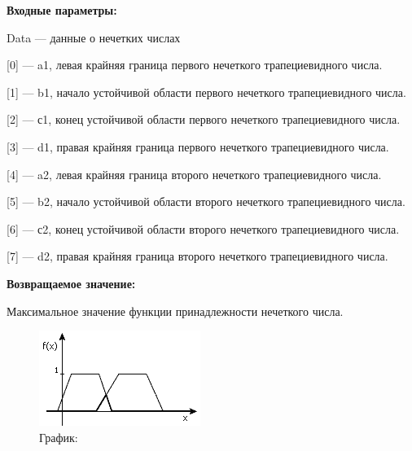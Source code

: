 \textbf{Входные параметры:}
 
Data --- данные о нечетких числах
 
[0] --- a1, левая крайняя граница первого нечеткого трапециевидного числа.
 
[1] --- b1, начало устойчивой области первого нечеткого трапециевидного числа.
 
[2] --- с1, конец устойчивой области первого нечеткого трапециевидного числа.
 
[3] --- d1, правая крайняя граница первого нечеткого трапециевидного числа.
 
[4] --- a2, левая крайняя граница второго нечеткого трапециевидного числа.
 
[5] --- b2, начало устойчивой области второго нечеткого трапециевидного числа.
 
[6] --- с2, конец устойчивой области второго нечеткого трапециевидного числа.
 
[7] --- d2, правая крайняя граница второго нечеткого трапециевидного числа.

\textbf{Возвращаемое значение:}
 
Максимальное значение функции принадлежности нечеткого числа.

 \begin{figure} [h] 
   \center
   \includegraphics {HML_MaxiMinTrapeziformFuzzyNumbers.png}
   \caption{График:} 
   \label{img:HML_MaxiMinTrapeziformFuzzyNumbers}  
 \end{figure}